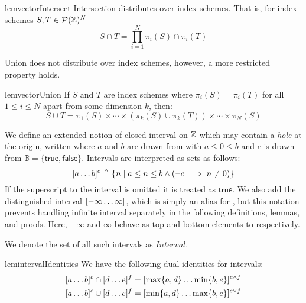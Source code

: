 \begin{restatable}{lem}{vectorIntersect}
\label{lem:vector-intersect}
  Intersection distributes over index schemes. That is, for index schemes $S, T
  \in \mathcal{P}(\textnormal{$\mathbb{Z}$})^N$
%
  \begin{equation*}
    S \cap T = \prod_{i = 1}^{N} \pi_i(S) \cap \pi_i(T)
  \end{equation*}
\end{restatable}

Union does not distribute over index schemes, however, a more restricted
property holds.

\begin{restatable}{lem}{vectorUnion}
\label{lem:vector-union} If
$S$ and $T$ are index schemes where $\pi_i(S) = \pi_i(T)$ for all $1 \leq i
\leq N$ apart from some dimension $k$, then:
%
  \begin{equation*}
    S \cup  T
    =
    \pi_1(S) \times \cdots \times
    (\pi_k(S) \cup \pi_k(T)) \times \cdots \times
    \pi_N(S)
  \end{equation*}
\end{restatable}
%
\begin{defn}
  We define an extended notion of closed interval on $\textnormal{$\mathbb{Z}$}{}$ which may contain a
  \emph{hole} at the origin, written  where $a$ and $b$ are
  drawn from \bz{} with $a \leq 0 \leq b$ and $c$ is drawn from $\mathbb{B} = \{
  \mathsf{true}, \mathsf{false} \}$. Intervals are interpreted as sets as
  follows:
%
  \begin{equation*}
    \textnormal{$\lbrack a\dots b\rbrack^{c}$} \triangleq
      \{ n \mid a \leq n \leq b \wedge (\neg c \implies n \neq 0) \}
  \end{equation*}
  If the
  superscript to the interval is omitted it is treated as $\mathsf{true}$.
  We also add the distinguished interval $\textnormal{$\lbrack-\infty\dots\infty\rbrack^{}$}$, which is simply an
  alias for \bz{}, but this notation prevents handling infinite interval
  separately in the following definitions, lemmas, and proofs. Here, $-\infty$
  and $\infty$ behave as top and bottom elements to \bz{} respectively.

  We denote the set of all such intervals as $\textit{Interval}$. 
\end{defn}
%
\begin{restatable}{lem}{intervalIdentities}
 \label{lem:interval-identities}
  We have the following dual identities for \bz{} intervals:
%
  \begin{align*}
    \textnormal{$\lbrack a\dots b\rbrack^{c}$} \cap \textnormal{$\lbrack d\dots e\rbrack^{f}$} & =
      \textnormal{$\lbrack\max \{a,d\}\dots\min \{b,e\}\rbrack^{c \wedge f}$} \\
    \textnormal{$\lbrack a\dots b\rbrack^{c}$} \cup \textnormal{$\lbrack d\dots e\rbrack^{f}$} & =
      \textnormal{$\lbrack\min \{a,d\}\dots\max \{b,e\}\rbrack^{c \vee f}$}
  \end{align*}
\end{restatable}
%

